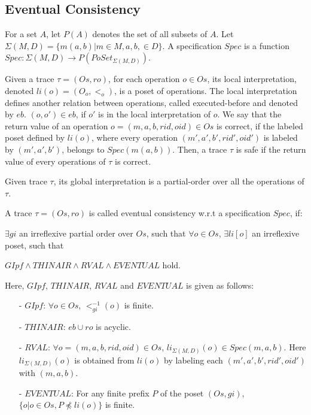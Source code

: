 \subsection{Eventual Consistency}
\label{subsec:eventual consistency}

For a set $A$, let $P(A)$ denotes the set of all subsets of $A$. Let $\Sigma(M,D) = \{ m(a,b) \vert m \in M, a,b, \in D \}$. A specification $Spec$ is a function $Spec: \Sigma(M,D) \rightarrow P(PoSet_{\Sigma(M,D)})$.

Given a trace $\tau = (Os,ro)$, for each operation $o \in Os$, its local interpretation, denoted $li(o) = (O_o,<_o)$, is a poset of operations. The local interpretation defines another relation between operations, called executed-before and denoted by $eb$. $(o,o') \in eb$, if $o'$ is in the local interpretation of $o$. We say that the return value of an operation $o = (m,a,b,rid,oid) \in Os$ is correct, if the labeled poset defined by $li(o)$, where every operation $(m',a',b',rid',oid')$ is labeled by $(m',a',b')$, belongs to $Spec(m(a,b))$. Then, a trace $\tau$ is safe if the return value of every operations of $\tau$ is correct.

Given trace $\tau$, its global interpretation is a partial-order over all the operations of $\tau$.

\begin{definition}
A trace $\tau = (Os,ro)$ is called eventual consistency w.r.t a specification $Spec$, if:

$\exists gi$ an irreflexive partial order over $Os$, such that $\forall o \in Os$, $\exists li[o]$ an irreflexive poset, such that

$\textit{GIpf} \wedge \textit{THINAIR} \wedge \textit{RVAL} \wedge \textit{EVENTUAL}$ hold.
\end{definition}

Here, $GIpf$, $THINAIR$, $RVAL$ and $EVENTUAL$ is given as follows:

\begin{itemize}
\setlength{\itemsep}{0.5pt}
\item[-] $\textit{GIpf}$: $\forall o \in Os$, $<^{-1}_{gi}(o)$ is finite.

\item[-] $\textit{THINAIR}$: $eb \cup ro$ is acyclic.

\item[-] $\textit{RVAL}$: $\forall o = (m,a,b,rid,oid) \in Os$, $li_{\Sigma(M,D)}(o) \in Spec(m,a,b)$. Here $li_{\Sigma(M,D)}(o)$ is obtained from $li(o)$ by labeling each $(m',a',b',rid',oid')$ with $(m,a,b)$.

\item[-] $\textit{EVENTUAL}$: For any finite prefix $P$ of the poset $(Os,gi)$, $\{ o \vert o \in Os, P \npreceq li(o) \}$ is finite.
\end{itemize}
